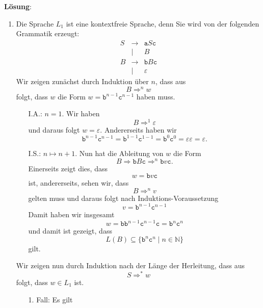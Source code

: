 \documentclass{article}
\newcommand{\solution}{
\vspace*{0.3cm}

\noindent
\textbf{L\"osung}: }
\begin{document}
\solution
\begin{enumerate}
\item Die Sprache $L_1$ ist eine kontextfreie Sprache, denn Sie wird von der folgenden
      Grammatik erzeugt:
      \begin{eqnarray*}
        S & \rightarrow & \texttt{a} S \texttt{c} \\
          & \mid        & B                       \\[0.2cm]
        B & \rightarrow & \texttt{b} B \texttt{c} \\
          & \mid        & \varepsilon 
      \end{eqnarray*}
      Wir zeigen zun\"achst durch Induktion \"uber $n$, dass aus
      \[ B \Rightarrow^n w \]
      folgt, dass $w$ die Form $w = \texttt{b}^{n-1} \texttt{c}^{n-1}$ haben muss.
      \begin{enumerate}
      \item[I.A.:] $n=1$.  Wir haben 
                   \[ B \Rightarrow^1 \varepsilon \]
                   und daraus folgt $w = \varepsilon$.  Andererseits haben wir 
                   \[ \texttt{b}^{n-1} \texttt{c}^{n-1} = \texttt{b}^{1-1} \texttt{c}^{1-1} = 
                      \texttt{b}^{0} \texttt{c}^{0} = \varepsilon \varepsilon = \varepsilon.
                   \]   
      \item[I.S.:] $n \mapsto n + 1$.  Nun hat die Ableitung von $w$ die Form
                   \[ B \Rightarrow \texttt{b} B \texttt{c} \Rightarrow^n \texttt{b} v \texttt{c}. \]
                   Einerseits zeigt dies, dass
                   \[ w = \texttt{b} v \texttt{c} \]
                   ist, andererseits, sehen wir, dass 
                   \[ B \Rightarrow^n v \]
                   gelten muss und daraus folgt nach Induktions-Voraussetzung 
                   \[ v = \texttt{b}^{n-1} \texttt{c}^{n-1} \]
                   Damit haben wir insgesamt
                   \[ w = \texttt{b} \texttt{b}^{n-1} \texttt{c}^{n-1} \texttt{c} = 
                          \texttt{b}^{n} \texttt{c}^{n}
                   \]
                   und damit ist gezeigt, dass
                   \[ L(B) \subseteq \{ \texttt{b}^{n} \texttt{c}^{n} \mid n \in \mathbb{N} \} \]
                   gilt.
      \end{enumerate}
      Wir zeigen nun durch Induktion nach der L\"ange der Herleitung, dass aus
      \[ S \Rightarrow^* w \]
      folgt, dass $w \in L_1$ ist.
      \begin{enumerate}
      \item[1. Fall:]  Es gilt

\end{enumerate}
\end{enumerate}
\end{document}
